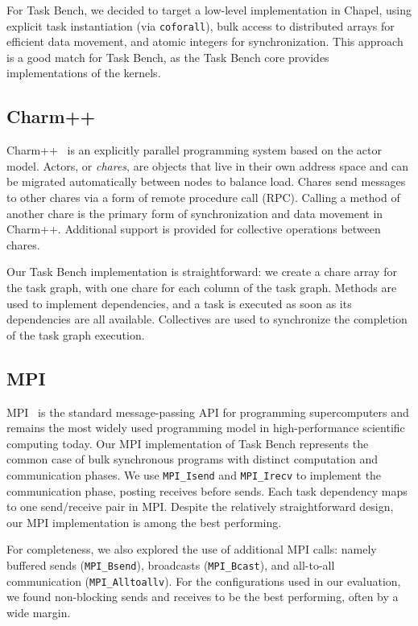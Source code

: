 For Task Bench, we decided to target a low-level implementation in
Chapel, using explicit task instantiation (via
\lstinline[language=Chapel]{coforall}), bulk access to distributed
arrays for efficient data movement, and atomic integers for
synchronization. This approach is a good match for Task Bench, as the
Task Bench core provides implementations of the kernels.

\subsection{Charm++}

Charm++~\cite{Charmpp93} is an explicitly parallel programming system
based on the actor model. Actors, or
\emph{chares}, are objects that live in their own address space and
can be migrated automatically between nodes to
balance load. Chares send messages to other chares via a
form of remote procedure call (RPC). Calling a method of another chare
is the primary form of synchronization and data movement in
Charm++. Additional support is provided for collective operations
between chares.

Our Task Bench implementation is straightforward: we create a chare
array for the task graph, with one chare for each column of the task graph. Methods are
used to implement dependencies, and a task is executed as soon as its
dependencies are all available. Collectives are used to synchronize the
completion of the task graph execution.


\subsection{MPI}

MPI~\cite{MPI} is the standard message-passing API for
programming supercomputers and remains the most widely used programming
model in high-performance scientific computing today. Our
MPI implementation of Task Bench represents the common case of bulk synchronous programs with distinct computation and
communication phases. We use \lstinline[language=C++]{MPI_Isend} and
\lstinline[language=C++]{MPI_Irecv} to implement the communication
phase, posting receives before sends. Each task dependency maps to one
send/receive pair in MPI. Despite the relatively straightforward
design, our MPI implementation is among the best performing.

For completeness, we also explored the use of additional MPI calls:
namely buffered sends (\lstinline[language=C++]{MPI_Bsend}),
broadcasts (\lstinline[language=C++]{MPI_Bcast}), and all-to-all
communication (\lstinline[language=C++]{MPI_Alltoallv}). For the
configurations used in our evaluation, we found non-blocking sends and
receives to be the best performing, often by a wide margin.

